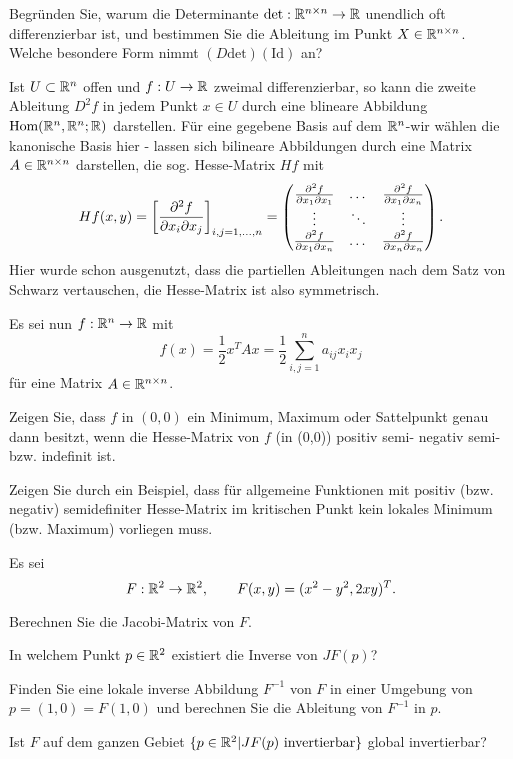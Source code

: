 \begin{Problem}
	Begründen Sie, warum die Determinante $\text{det}:\mathbb{R}^{n\times n}\to \mathbb{R}$ unendlich oft differenzierbar ist, und bestimmen Sie die Ableitung im Punkt $X\in \mathbb{R}^{n\times n}$. Welche besondere Form nimmt $(D\text{det})(\text{Id})$ an?  	
\end{Problem}

\begin{Problem}
	Ist $U\subset \mathbb{R}^n$ offen und $f:U\to \mathbb{R}$ zweimal differenzierbar, so kann die zweite Ableitung $D^2f$ in jedem Punkt $x\in U$ durch eine blineare Abbildung $\text{Hom}(\mathbb{R}^n,\mathbb{R}^n;\mathbb{R})$ darstellen. F\"{u}r eine gegebene Basis auf dem $\mathbb{R}^n$-wir wählen die kanonische Basis hier - lassen sich bilineare Abbildungen durch eine Matrix $A\in \mathbb{R}^{n\times n}$ darstellen, die sog. Hesse-Matrix $Hf$ mit
	\[
		Hf(x,y)=\left[ \pdv[2]{f}{x_i}{x_j}(x) \right]_{i,j=1,\dots, n}=\begin{pmatrix} \pdv[2]{f}{x_1}{x_1} & \dots & \pdv[2]{f}{x_1}{x_n} \\ \vdots & \ddots & \vdots \\ \pdv[2]{f}{x_1}{x_n} & \dots & \pdv[2]{f}{x_n}{x_n}\end{pmatrix} 
	.\] 
Hier wurde schon ausgenutzt, dass die partiellen Ableitungen nach dem Satz von Schwarz vertauschen, die Hesse-Matrix ist also symmetrisch.

Es sei nun $f:\mathbb{R}^n\to \mathbb{R}$ mit
\[
	f(x)=\frac{1}{2}x^T Ax=\frac{1}{2}\sum_{i,j=1}^n a_{ij}x_i x_j
\]
f\"{u}r eine Matrix $A\in \mathbb{R}^{n\times n}$.
\begin{parts}
	\item Zeigen Sie, dass $f$ in $(0,0)$ ein Minimum, Maximum oder Sattelpunkt genau dann besitzt, wenn die Hesse-Matrix von $f$ (in (0,0)) positiv semi- negativ semi- bzw. indefinit ist. 
	\item Zeigen Sie durch ein Beispiel, dass für allgemeine Funktionen mit positiv (bzw. negativ) semidefiniter Hesse-Matrix im kritischen Punkt kein lokales Minimum (bzw. Maximum) vorliegen muss.  
\end{parts}
\end{Problem}

\begin{Problem}
	Es sei
	\[
		F:\mathbb{R}^2\to \mathbb{R}^2, \qquad F(x,y)=(x^2-y^2,2xy)^T
	.\] 
	\begin{parts}
	\item Berechnen Sie die Jacobi-Matrix von $F$.
	\item In welchem Punkt $p\in \mathbb{R}^2$ existiert die Inverse von $JF(p)$?
	\item Finden Sie eine lokale inverse Abbildung $F^{-1}$ von $F$ in einer Umgebung von $p=(1,0)=F(1,0)$ und berechnen Sie die Ableitung von $F^{-1}$ in $p$.
	\item Ist $F$ auf dem ganzen Gebiet $\{p\in \mathbb{R}^2|JF(p)\text{ invertierbar}\} $ global invertierbar?
	\end{parts}
\end{Problem}

